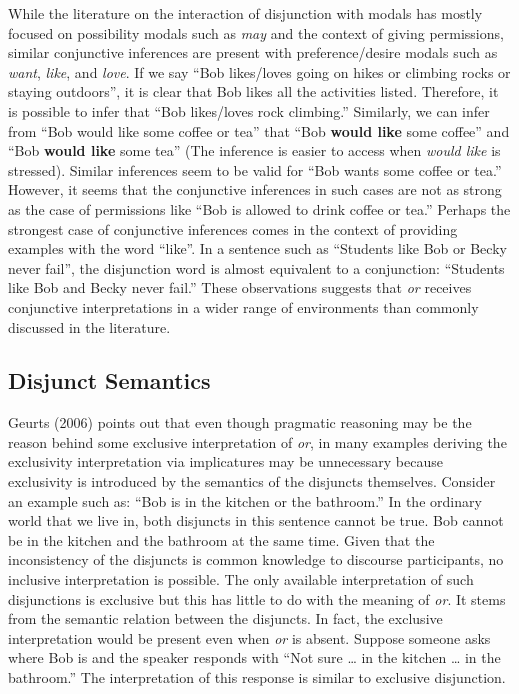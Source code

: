 \documentclass[oneside]{report}
\theoremstyle{definition}
\theoremstyle{definition}
\theoremstyle{definition}
\theoremstyle{remark}
\begin{document}
While the literature on the interaction of disjunction with modals has
mostly focused on possibility modals such as \emph{may} and the context
of giving permissions, similar conjunctive inferences are present with
preference/desire modals such as \emph{want}, \emph{like}, and
\emph{love}. If we say ``Bob likes/loves going on hikes or climbing
rocks or staying outdoors'', it is clear that Bob likes all the
activities listed. Therefore, it is possible to infer that ``Bob
likes/loves rock climbing.'' Similarly, we can infer from ``Bob would
like some coffee or tea'' that ``Bob \textbf{would like} some coffee''
and ``Bob \textbf{would like} some tea'' (The inference is easier to
access when \emph{would like} is stressed). Similar inferences seem to
be valid for ``Bob wants some coffee or tea.'' However, it seems that
the conjunctive inferences in such cases are not as strong as the case
of permissions like ``Bob is allowed to drink coffee or tea.'' Perhaps
the strongest case of conjunctive inferences comes in the context of
providing examples with the word ``like''. In a sentence such as
``Students like Bob or Becky never fail'', the disjunction word is
almost equivalent to a conjunction: ``Students like Bob and Becky never
fail.'' These observations suggests that \emph{or} receives conjunctive
interpretations in a wider range of environments than commonly discussed
in the literature.

\subsection{Disjunct Semantics}\label{disjunct-semantics}

Geurts (2006) points out that even though pragmatic reasoning may be the
reason behind some exclusive interpretation of \emph{or}, in many
examples deriving the exclusivity interpretation via implicatures may be
unnecessary because exclusivity is introduced by the semantics of the
disjuncts themselves. Consider an example such as: ``Bob is in the
kitchen or the bathroom.'' In the ordinary world that we live in, both
disjuncts in this sentence cannot be true. Bob cannot be in the kitchen
and the bathroom at the same time. Given that the inconsistency of the
disjuncts is common knowledge to discourse participants, no inclusive
interpretation is possible. The only available interpretation of such
disjunctions is exclusive but this has little to do with the meaning of
\emph{or}. It stems from the semantic relation between the disjuncts. In
fact, the exclusive interpretation would be present even when \emph{or}
is absent. Suppose someone asks where Bob is and the speaker responds
with ``Not sure \ldots{} in the kitchen \ldots{} in the bathroom.'' The
interpretation of this response is similar to exclusive disjunction.
\end{document}
